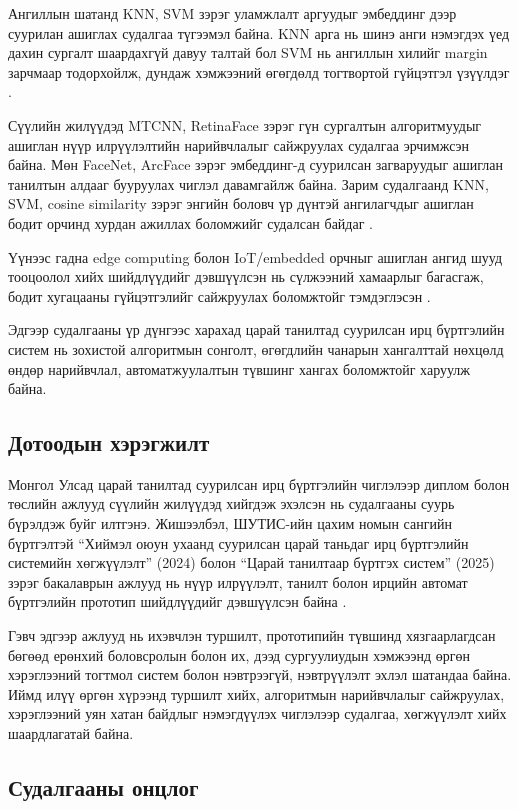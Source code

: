 Ангиллын шатанд KNN, SVM зэрэг уламжлалт аргуудыг эмбеддинг дээр суурилан ашиглах судалгаа түгээмэл байна. KNN арга нь шинэ анги нэмэгдэх үед дахин сургалт шаардахгүй давуу талтай бол SVM нь ангиллын хилийг margin зарчмаар тодорхойлж, дундаж хэмжээний өгөгдөлд тогтвортой гүйцэтгэл үзүүлдэг \cite{chen2019face}.

Сүүлийн жилүүдэд MTCNN, RetinaFace зэрэг гүн сургалтын алгоритмуудыг ашиглан нүүр илрүүлэлтийн нарийвчлалыг сайжруулах судалгаа эрчимжсэн байна. Мөн FaceNet, ArcFace зэрэг эмбеддинг-д суурилсан загваруудыг ашиглан танилтын алдааг бууруулах чиглэл давамгайлж байна. Зарим судалгаанд KNN, SVM, cosine similarity зэрэг энгийн боловч үр дүнтэй ангилагчдыг ашиглан бодит орчинд хурдан ажиллах боломжийг судалсан байдаг \cite{luo2025opencv,devi2025svm}.

Үүнээс гадна edge computing болон IoT/embedded орчныг ашиглан ангид шууд тооцоолол хийх шийдлүүдийг дэвшүүлсэн нь сүлжээний хамаарлыг багасгаж, бодит хугацааны гүйцэтгэлийг сайжруулах боломжтойг тэмдэглэсэн \cite{yadav2021inbrowser,vu2024ble}.

Эдгээр судалгааны үр дүнгээс харахад царай танилтад суурилсан ирц бүртгэлийн систем нь зохистой алгоритмын сонголт, өгөгдлийн чанарын хангалттай нөхцөлд өндөр нарийвчлал, автоматжуулалтын түвшинг хангах боломжтойг харуулж байна.

\subsection{Дотоодын хэрэгжилт}

Монгол Улсад царай танилтад суурилсан ирц бүртгэлийн чиглэлээр диплом болон төслийн ажлууд сүүлийн жилүүдэд хийгдэж эхэлсэн нь судалгааны суурь бүрэлдэж буйг илтгэнэ. Жишээлбэл, ШУТИС-ийн цахим номын сангийн бүртгэлтэй ``Хиймэл оюун ухаанд суурилсан царай таньдаг ирц бүртгэлийн системийн хөгжүүлэлт'' (2024) болон ``Царай танилтаар бүртгэх систем'' (2025) зэрэг бакалаврын ажлууд нь нүүр илрүүлэлт, танилт болон ирцийн автомат бүртгэлийн прототип шийдлүүдийг дэвшүүлсэн байна \cite{must_enkhjin2024,must_uuganbayar2025}.

Гэвч эдгээр ажлууд нь ихэвчлэн туршилт, прототипийн түвшинд хязгаарлагдсан бөгөөд ерөнхий боловсролын болон их, дээд сургуулиудын хэмжээнд өргөн хэрэглээний тогтмол систем болон нэвтрээгүй, нэвтрүүлэлт эхлэл шатандаа байна. Иймд илүү өргөн хүрээнд туршилт хийх, алгоритмын нарийвчлалыг сайжруулах, хэрэглээний уян хатан байдлыг нэмэгдүүлэх чиглэлээр судалгаа, хөгжүүлэлт хийх шаардлагатай байна.
\subsection{Судалгааны онцлог}

